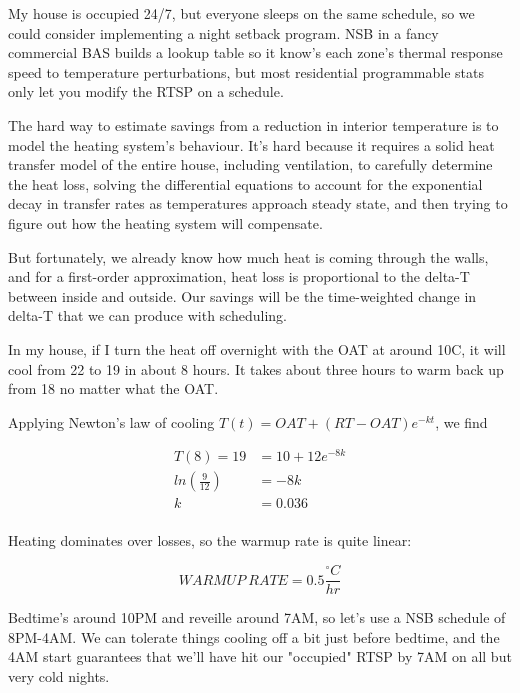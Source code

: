 \documentclass[11pt]{article}
\begin{document}
My house is occupied 24/7, but everyone sleeps on the same schedule, so
we could consider implementing a night setback program. NSB in a fancy
commercial BAS builds a lookup table so it know's each zone's thermal
response speed to temperature perturbations, but most residential
programmable stats only let you modify the RTSP on a schedule.

The hard way to estimate savings from a reduction in interior
temperature is to model the heating system's behaviour. It's hard
because it requires a solid heat transfer model of the entire house,
including ventilation, to carefully determine the heat loss, solving the
differential equations to account for the exponential decay in transfer
rates as temperatures approach steady state, and then trying to figure
out how the heating system will compensate.

But fortunately, we already know how much heat is coming through the
walls, and for a first-order approximation, heat loss is proportional to
the delta-T between inside and outside. Our savings will be the
time-weighted change in delta-T that we can produce with scheduling.

In my house, if I turn the heat off overnight with the OAT at around
10C, it will cool from 22 to 19 in about 8 hours. It takes about three
hours to warm back up from 18 no matter what the OAT.

Applying Newton's law of cooling \(T(t)=OAT+(RT-OAT)e^{-kt}\), we find

\begin{align*}
T(8)=19 & =10+12e^{-8k}\\
ln(\frac{9}{12}) & =-8k\\
k & =0.036\\
\end{align*}

Heating dominates over losses, so the warmup rate is quite linear:

\[WARMUP\:RATE = 0.5\frac{^{\circ}C}{hr}\]

Bedtime's around 10PM and reveille around 7AM, so let's use a NSB
schedule of 8PM-4AM. We can tolerate things cooling off a bit just
before bedtime, and the 4AM start guarantees that we'll have hit our
"occupied" RTSP by 7AM on all but very cold nights.
\end{document}
